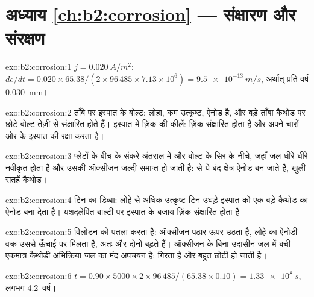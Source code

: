 \section*{अध्याय \ref{ch:b2:corrosion} --- संक्षारण और संरक्षण}

\begin{solution}{exo:b2:corrosion:1}
$j = \qty{0.020}{A/m^2}$: $de/dt = 0.020 \times 65.38/(2 \times 96\,485 \times 7.13
\times 10^6) = \qty{9.5e-13}{m/s}$, अर्थात् प्रति वर्ष \qty{0.030}{mm}।
\end{solution}

\begin{solution}{exo:b2:corrosion:2}
ताँबे पर इस्पात के बोल्ट: लोहा, कम उत्कृष्ट, ऐनोड है, और बड़े ताँबा कैथोड पर
छोटे बोल्ट तेज़ी से संक्षारित होते हैं। इस्पात में ज़िंक की कीलें: ज़िंक संक्षारित होता है
और अपने चारों ओर के इस्पात की रक्षा करता है।
\end{solution}

\begin{solution}{exo:b2:corrosion:3}
प्लेटों के बीच के संकरे अंतराल में और बोल्ट के सिर के नीचे, जहाँ जल
धीरे-धीरे नवीकृत होता है और उसकी ऑक्सीजन जल्दी समाप्त हो जाती है:  से
ये बंद क्षेत्र ऐनोड बन जाते हैं, खुली सतहें कैथोड।
\end{solution}

\begin{solution}{exo:b2:corrosion:4}
टिन का डिब्बा: लोहे से अधिक उत्कृष्ट टिन उघड़े इस्पात को एक बड़े कैथोड का
ऐनोड बना देता है। यशदलेपित बाल्टी पर इस्पात के बजाय ज़िंक
संक्षारित होता है।
\end{solution}

\begin{solution}{exo:b2:corrosion:5}
विलोडन  को पतला करता है: ऑक्सीजन पठार ऊपर उठता है, लोहे का ऐनोडी वक्र
उससे ऊँचाई पर मिलता है, अतः  और  दोनों बढ़ते हैं। ऑक्सीजन के बिना उदासीन जल में बची एकमात्र कैथोडी अभिक्रिया
जल का मंद अपचयन है:  गिरता है और
 बहुत छोटी हो जाती है।
\end{solution}

\begin{solution}{exo:b2:corrosion:6}
$t = 0.90 \times 5000 \times 2 \times 96\,485/(65.38 \times 0.10) = \qty{1.33e8}{s}$,
लगभग 4.2~वर्ष।
\end{solution}

